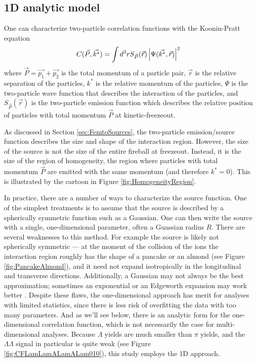 \subsection{1D analytic model}
\label{sec:AnalyticModel}


One can characterize two-particle correlation functions with the Koonin-Pratt equation
\begin{equation}
\label{eq:KooninPratt}
C(\vec{P}, \vec{k^*}) =  \int d^3r S_{\vec{P}} (\vec{r}) \left\lvert\Psi(\vec{k^*},\vec{r})\right\rvert^2
\end{equation}
where $\vec{P} = \vec{p_1} + \vec{p_2}$ is the total momentum of a particle pair, $\vec{r}$ is the relative separation of the particles, $k^*$ is the relative momentum of the particles, $\Psi$ is the two-particle wave function that describes the interaction of the particles, and $S_{\vec{P}} (\vec{r})$ is the two-particle emission function which describes the relative position of particles with total momentum $\vec{P}$ at kinetic-freezeout.

As discussed in Section \ref{sec:FemtoSources}, the two-particle emission/source function describes the size and shape of the interaction region.
However, the size of the source is not the size of the entire fireball at freezeout.
Instead, it is the size of the region of homogeneity, the region where particles with total momentum $\vec{P}$ are emitted with the same momentum (and therefore $k^* = 0$).
This is illustrated by the cartoon in Figure \ref{fig:HomogeneityRegion}.

In practice, there are a number of ways to characterize the source function.
One of the simplest treatments is to assume that the source is described by a spherically symmetric function such as a Gaussian.
One can then write the source with a single, one-dimensional parameter, often a Guassian radius $R$.
There are several weaknesses to this method.
For example the source is likely not spherically symmetric --- at the moment of the collision of the ions the interaction region roughly has the shape of a pancake or an almond (see Figure \ref{fig:PancakeAlmond}), and it need not expand isotropically in the longitudinal and transverse directions.
Additionally, a Gaussian may not always be the best approximation; sometimes an exponential or an Edgeworth expansion may work better \cite{Abelev:2014pja}.
Despite these flaws, the one-dimensional approach has merit for analyses with limited statistics, since there is less risk of overfitting the data with too many parameters.
And as we'll see below, there is an analytic form for the one-dimensional correlation function, which is not necessarily the case for multi-dimensional analyses.
Because $\Lambda$ yields are much smaller than $\pi$ yields, and the $\Lambda\Lambda$ signal in particular is quite weak (see Figure \ref{fig:CFLamLamALamALam010}), this study employs the 1D approach.

